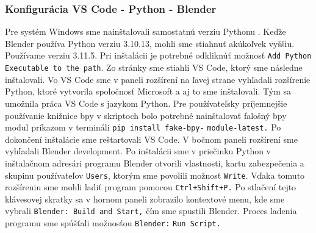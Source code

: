 \subsubsection{Konfigurácia VS Code - Python - Blender}
Pre systém Windows sme nainštalovali samostatnú verziu Pythonu \cite{PythonDownload}. Keďže Blender používa Python verziu 3.10.13, mohli sme stiahnuť akúkoľvek vyššiu. Používame verziu 3.11.5. Pri inštalácii je potrebné odkliknúť možnosť \verb|Add Python| \verb|Executable to the path|. Zo stránky \cite{VSCode} sme stiahli VS Code, ktorý sme následne inštalovali. Vo VS Code sme v paneli rozšírení na ľavej strane vyhľadali rozšírenie Python, ktoré vytvorila spoločnosť Microsoft a aj to sme inštalovali. Tým sa umožnila práca VS Code s jazykom Python. Pre používateľsky príjemnejšie používanie knižnice bpy v skriptoch bolo potrebné nainštalovať falošný bpy modul \cite{Fake-bpy-module} príkazom v termináli \verb|pip install fake-bpy-| \verb|module-latest.|
Po dokončení inštalácie sme reštartovali VS Code. V bočnom paneli rozšírení sme vyhľadali Blender development. Po inštalácii sme v priečinku Python v inštalačnom adresári programu Blender otvorili vlastnosti, kartu zabezpečenia a skupinu používateľov \verb|Users|, ktorým sme povolili možnosť \verb|Write|. Vďaka tomuto rozšíreniu sme mohli ladiť program pomocou \verb|Ctrl+Shift+P.| Po stlačení tejto klávesovej skratky sa v hornom paneli zobrazilo kontextové menu, kde sme vybrali \verb|Blender: Build and Start,| čím sme spustili Blender. Proces ladenia programu sme spúšťali možnosťou \verb|Blender:| \verb|Run Script.|
